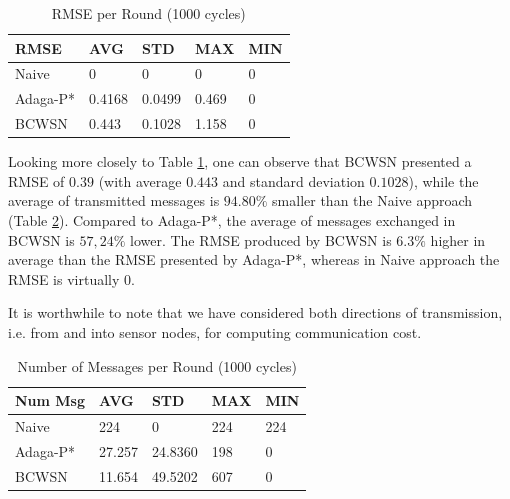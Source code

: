 \documentclass{acm_proc_article-sp}
\begin{document}
\begin{table}[h!]
\caption{RMSE per Round (1000 cycles)}
\label{tab:rmse}
\begin{center}
\begin{tabular}{|l||l|l|l|l|}
\hline
RMSE &AVG &STD &MAX &MIN \\
\hline\hline
Naive &0 &0 &0 &0 \\
\hline
Adaga-P* &0.4168 &0.0499 &0.469 &0 \\
\hline
BCWSN &0.443 &0.1028 &1.158 &0 \\
\hline
\end{tabular}
\end{center}
\end{table}


Looking more closely to Table \ref{tab:rmse}, one can observe that BCWSN
presented a RMSE of $0.39$ (with average $0.443$ and standard deviation $0.1028$),
while the average of transmitted messages is $94.80\%$ smaller than the Naive
approach (Table \ref{tab:num-msg}). Compared to Adaga-P*, the average of
messages exchanged in BCWSN is $57,24\%$ lower. The RMSE produced by BCWSN is
$6.3\%$ higher in average than the RMSE presented by Adaga-P*, whereas
in Naive approach the RMSE is virtually $0$.

It is worthwhile to note that we have considered both directions of
transmission, i.e. from and into sensor nodes, for computing communication cost.



\begin{table}[h!]
\caption{Number of Messages per Round (1000 cycles)}
\label{tab:num-msg}
\begin{center}
\begin{tabular}{|l||l|l|l|l|}
\hline
Num Msg &AVG &STD &MAX &MIN \\
\hline\hline
Naive &224 &0 &224 &224 \\
\hline
Adaga-P* &27.257 &24.8360 &198 &0 \\
\hline
BCWSN &11.654 &49.5202 &607 &0 \\
\hline
\end{tabular}
\end{center}
\end{table}
\end{document}
